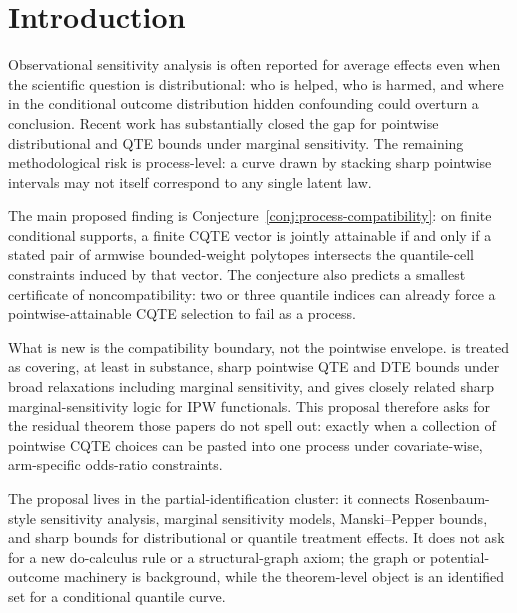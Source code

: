 \documentclass[11pt]{article}
\theoremstyle{definition}
\theoremstyle{plain}
\theoremstyle{remark}
\begin{document}
\section{Introduction}
Observational sensitivity analysis is often reported for average effects even when the scientific question is distributional: who is helped, who is harmed, and where in the conditional outcome distribution hidden confounding could overturn a conclusion.  Recent work has substantially closed the gap for pointwise distributional and QTE bounds under marginal sensitivity.  The remaining methodological risk is process-level: a curve drawn by stacking sharp pointwise intervals may not itself correspond to any single latent law.

The main proposed finding is Conjecture~\ref{conj:process-compatibility}: on finite conditional supports, a finite CQTE vector is jointly attainable if and only if a stated pair of armwise bounded-weight polytopes intersects the quantile-cell constraints induced by that vector.  The conjecture also predicts a smallest certificate of noncompatibility: two or three quantile indices can already force a pointwise-attainable CQTE selection to fail as a process.

What is new is the compatibility boundary, not the pointwise envelope.  \citet{MastenPoirierRen2025} is treated as covering, at least in substance, sharp pointwise QTE and DTE bounds under broad relaxations including marginal sensitivity, and \citet{DornGuo2023} gives closely related sharp marginal-sensitivity logic for IPW functionals.  This proposal therefore asks for the residual theorem those papers do not spell out: exactly when a collection of pointwise CQTE choices can be pasted into one process under covariate-wise, arm-specific odds-ratio constraints.

The proposal lives in the partial-identification cluster: it connects Rosenbaum-style sensitivity analysis, marginal sensitivity models, Manski--Pepper bounds, and sharp bounds for distributional or quantile treatment effects.  It does not ask for a new do-calculus rule or a structural-graph axiom; the graph or potential-outcome machinery is background, while the theorem-level object is an identified set for a conditional quantile curve.
\end{document}
